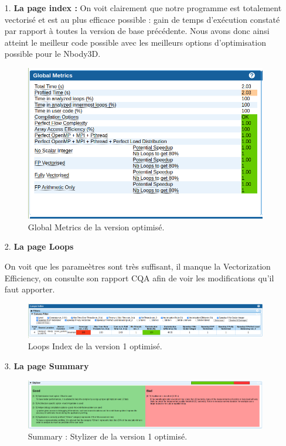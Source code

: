 \documentclass[a4paper, 12pt, twoside]{article}
\begin{document}
\begin{enumerate}
    \item[1.]\textbf{La page index : }
   On voit clairement que notre programme est totalement vectorisé et est au plus efficace possible : gain de temps d'exécution constaté
    par rapport à toutes la version de base précédente. Nous avons donc ainsi atteint le meilleur code possible avec les meilleurs options d'optimisation possible pour le Nbody3D. 
    \begin{figure}[h]
    \centering
    \includegraphics[width=\textwidth]{Figures/cap10.png}
    \caption{Global Metrics de la version optimisé.}
    
    \end{figure}
   \item[2.]\textbf{La page Loops}
   
   On voit que les parameètres sont très suffisant, il manque la Vectorization Efficiency, on consulte son rapport CQA afin de voir les modifications qu'il faut apporter.
   \begin{figure}[h]
    \centering
    \includegraphics[width=\textwidth]{Figures/cap11.png}
    \caption{Loops Index de la version 1 optimisé.}
    
    \end{figure}
  \newpage
     \item[3.]\textbf{La page Summary}
     
     \begin{figure}[h]
    \centering
    \includegraphics[width=\textwidth]{Figures/cap12.png}
    \caption{Summary : Stylizer de la version 1 optimisé.}
    

\end{figure}
\end{enumerate}
\end{document}
